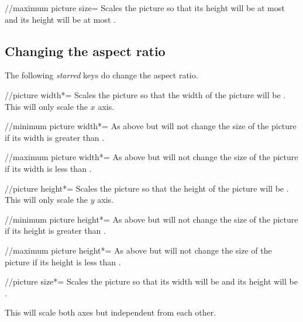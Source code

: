 \begin{multicols}{2}
\begin{key}{/\tikzext/maximum picture size=}
  Scales the picture so that its height will be at most 
  and its height will be at most .
\end{key}

\subsection{Changing the aspect ratio}
The following \emph{starred} keys do change the aspect ratio.
\begin{key}{/\tikzext/picture width*=}
  Scales the picture so that the width of the picture will be .
  This will only scale the $x$ axis.
\end{key}

\begin{key}{/\tikzext/minimum picture width*=}
  As above but will not change the size of the picture
  if its width is greater than .
\end{key}

\begin{key}{/\tikzext/maximum picture width*=}
  As above but will not change the size of the picture
  if its width is less than .
\end{key}

\begin{key}{/\tikzext/picture height*=}
  Scales the picture so that the height of the picture will be .
  This will only scale the $y$ axis.
\end{key}

\begin{key}{/\tikzext/minimum picture height*=}
  As above but will not change the size of the picture
  if its height is greater than .
\end{key}

\begin{key}{/\tikzext/maximum picture height*=}
  As above but will not change the size of the picture
  if its height is less than .
\end{key}

\begin{key}{/\tikzext/picture size*=}
  Scales the picture so that its width will be 
  and its height will be .
  
  This will scale both axes but independent from each other.
\end{key}
\end{multicols}